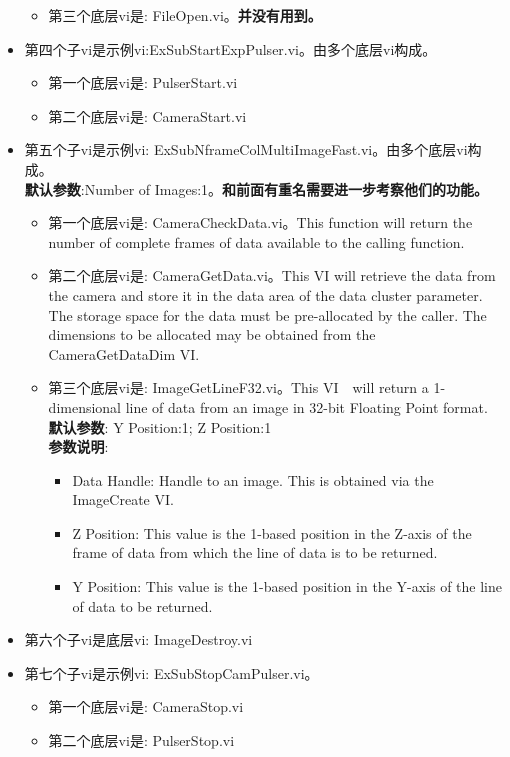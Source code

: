 \begin{itemize}
\begin{itemize}
\item 第三个底层vi是: FileOpen.vi。\textbf{并没有用到。}
\end{itemize}

\item 第四个子vi是示例vi:ExSubStartExpPulser.vi。由多个底层vi构成。
\begin{itemize}
\item 第一个底层vi是: PulserStart.vi
\item 第二个底层vi是: CameraStart.vi
\end{itemize}

\item 第五个子vi是示例vi: ExSubNframeColMultiImageFast.vi。由多个底层vi构成。
\\ \textbf{默认参数}:Number of Images:1。\textbf{和前面有重名需要进一步考察他们的功能。} 
\begin{itemize}
\item 第一个底层vi是: CameraCheckData.vi。This function will return the number of complete frames of data available to the calling function.
\item 第二个底层vi是: CameraGetData.vi。This VI will retrieve the data from the camera 
and store it in the data area of the data cluster parameter. The storage space for the
data must be pre-allocated by the caller. The dimensions to be allocated may be obtained
from the CameraGetDataDim VI.
\item 第三个底层vi是: ImageGetLineF32.vi。This VI　will return a 1-dimensional line of data from an image in 32-bit Floating Point format. 
\\ \textbf{默认参数}: Y Position:1; Z Position:1
\\ \textbf{参数说明}:
\begin{itemize}
\item Data Handle: Handle to an image. This is obtained via the ImageCreate VI.
\item Z Position: This value is the 1-based position in the Z-axis of the frame of data from which the line of data is to be returned.
\item Y Position: This value is the 1-based position in the Y-axis of the line of data to be returned.
\end{itemize} 	
\end{itemize}

\item 第六个子vi是底层vi: ImageDestroy.vi

\item 第七个子vi是示例vi: ExSubStopCamPulser.vi。
\begin{itemize}
\item 第一个底层vi是: CameraStop.vi
\item 第二个底层vi是: PulserStop.vi
\end{itemize}
\end{itemize}



